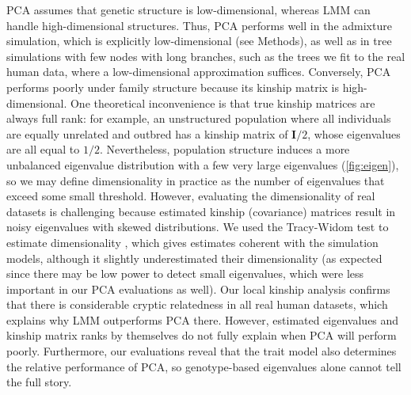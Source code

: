\documentclass[11pt]{article}
\begin{document}
PCA assumes that genetic structure is low-dimensional, whereas LMM can handle high-dimensional structures.
Thus, PCA performs well in the admixture simulation, which is explicitly low-dimensional (see Methods), as well as in tree simulations with few nodes with long branches, such as the trees we fit to the real human data, where a low-dimensional approximation suffices.
Conversely, PCA performs poorly under family structure because its kinship matrix is high-dimensional.
One theoretical inconvenience is that true kinship matrices are always full rank: for example, an unstructured population where all individuals are equally unrelated and outbred has a kinship matrix of $\mathbf{I}/2$, whose eigenvalues are all equal to $1/2$.
Nevertheless, population structure induces a more unbalanced eigenvalue distribution with a few very large eigenvalues (\cref{fig:eigen}), so we may define dimensionality in practice as the number of eigenvalues that exceed some small threshold.
However, evaluating the dimensionality of real datasets is challenging because estimated kinship (covariance) matrices result in noisy eigenvalues with skewed distributions.
We used the Tracy-Widom test to estimate dimensionality \citep{patterson_population_2006}, which gives estimates coherent with the simulation models, although it slightly underestimated their dimensionality (as expected since there may be low power to detect small eigenvalues, which were less important in our PCA evaluations as well).
Our local kinship analysis confirms that there is considerable cryptic relatedness in all real human datasets, which explains why LMM outperforms PCA there.
However, estimated eigenvalues and kinship matrix ranks by themselves do not fully explain when PCA will perform poorly.
Furthermore, our evaluations reveal that the trait model also determines the relative performance of PCA, so genotype-based eigenvalues alone cannot tell the full story.
\end{document}
